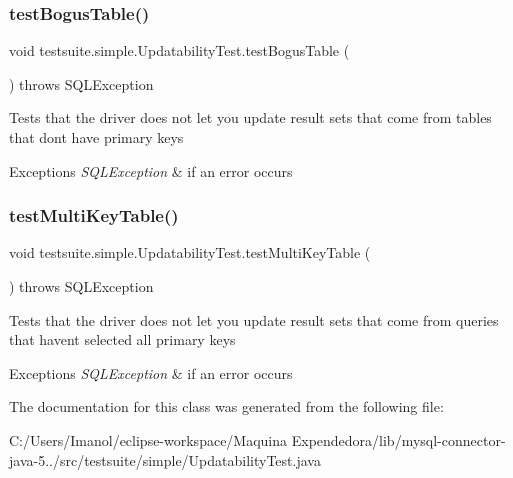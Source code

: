 \subsubsection{\texorpdfstring{test\+Bogus\+Table()}{testBogusTable()}}
{\footnotesize\ttfamily void testsuite.\+simple.\+Updatability\+Test.\+test\+Bogus\+Table (\begin{DoxyParamCaption}{ }\end{DoxyParamCaption}) throws S\+Q\+L\+Exception}

Tests that the driver does not let you update result sets that come from tables that don\textquotesingle{}t have primary keys


\begin{DoxyExceptions}{Exceptions}
{\em S\+Q\+L\+Exception} & if an error occurs \\
\hline
\end{DoxyExceptions}
\mbox{\label{classtestsuite_1_1simple_1_1_updatability_test_a689afecd2b1890b04a4c7b3a34fba460}} 
\subsubsection{\texorpdfstring{test\+Multi\+Key\+Table()}{testMultiKeyTable()}}
{\footnotesize\ttfamily void testsuite.\+simple.\+Updatability\+Test.\+test\+Multi\+Key\+Table (\begin{DoxyParamCaption}{ }\end{DoxyParamCaption}) throws S\+Q\+L\+Exception}

Tests that the driver does not let you update result sets that come from queries that haven\textquotesingle{}t selected all primary keys


\begin{DoxyExceptions}{Exceptions}
{\em S\+Q\+L\+Exception} & if an error occurs \\
\hline
\end{DoxyExceptions}


The documentation for this class was generated from the following file\+:\begin{DoxyCompactItemize}
\item 
C\+:/\+Users/\+Imanol/eclipse-\/workspace/\+Maquina Expendedora/lib/mysql-\/connector-\/java-\/5../src/testsuite/simple/Updatability\+Test.\+java\end{DoxyCompactItemize}
